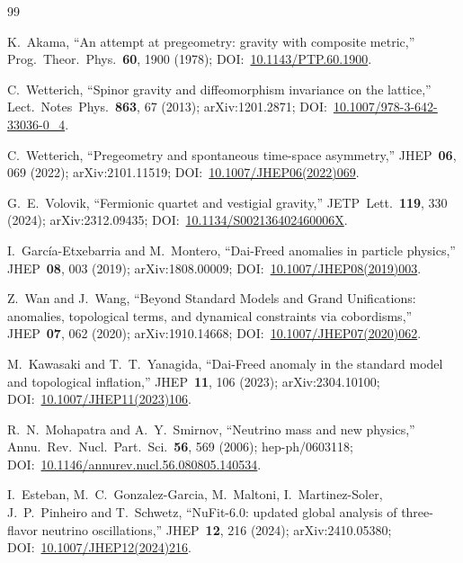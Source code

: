 \documentclass[aps,prd,twocolumn,showpacs,superscriptaddress,nofootinbib]{revtex4-2}
\begin{document}
\begin{thebibliography}{99}

K.~Akama, ``An attempt at pregeometry: gravity with composite metric,''
Prog.~Theor.~Phys.~\textbf{60}, 1900 (1978);
DOI:~\href{https://doi.org/10.1143/PTP.60.1900}{10.1143/PTP.60.1900}.

C.~Wetterich, ``Spinor gravity and diffeomorphism invariance on the
lattice,'' Lect.~Notes~Phys.~\textbf{863}, 67 (2013); arXiv:1201.2871;
DOI:~\href{https://doi.org/10.1007/978-3-642-33036-0_4}{10.1007/978-3-642-33036-0\_4}.

C.~Wetterich, ``Pregeometry and spontaneous time-space asymmetry,''
JHEP~\textbf{06}, 069 (2022); arXiv:2101.11519;
DOI:~\href{https://doi.org/10.1007/JHEP06(2022)069}{10.1007/JHEP06(2022)069}.

G.~E.~Volovik, ``Fermionic quartet and vestigial gravity,''
JETP~Lett.~\textbf{119}, 330 (2024); arXiv:2312.09435;
DOI:~\href{https://doi.org/10.1134/S002136402460006X}{10.1134/S002136402460006X}.

I.~Garc\'ia-Etxebarria and M.~Montero, ``Dai-Freed anomalies in
particle physics,'' JHEP~\textbf{08}, 003 (2019); arXiv:1808.00009;
DOI:~\href{https://doi.org/10.1007/JHEP08(2019)003}{10.1007/JHEP08(2019)003}.

Z.~Wan and J.~Wang, ``Beyond Standard Models and Grand Unifications:
anomalies, topological terms, and dynamical constraints via
cobordisms,'' JHEP~\textbf{07}, 062 (2020); arXiv:1910.14668;
DOI:~\href{https://doi.org/10.1007/JHEP07(2020)062}{10.1007/JHEP07(2020)062}.

M.~Kawasaki and T.~T.~Yanagida, ``Dai-Freed anomaly in the
standard model and topological inflation,'' JHEP~\textbf{11}, 106
(2023); arXiv:2304.10100;
DOI:~\href{https://doi.org/10.1007/JHEP11(2023)106}{10.1007/JHEP11(2023)106}.

R.~N.~Mohapatra and A.~Y.~Smirnov, ``Neutrino mass and new physics,''
Annu.~Rev.~Nucl.~Part.~Sci.~\textbf{56}, 569 (2006); hep-ph/0603118;
DOI:~\href{https://doi.org/10.1146/annurev.nucl.56.080805.140534}{10.1146/annurev.nucl.56.080805.140534}.

I.~Esteban, M.~C.~Gonzalez-Garcia, M.~Maltoni, I.~Martinez-Soler,
J.~P.~Pinheiro and T.~Schwetz, ``NuFit-6.0: updated global analysis
of three-flavor neutrino oscillations,'' JHEP~\textbf{12}, 216
(2024); arXiv:2410.05380;
DOI:~\href{https://doi.org/10.1007/JHEP12(2024)216}{10.1007/JHEP12(2024)216}.


\end{thebibliography}
\end{document}
